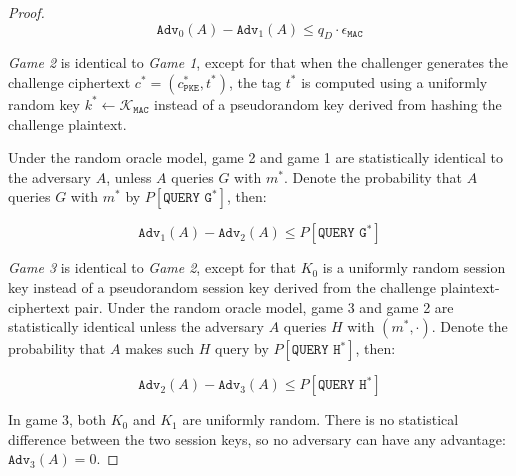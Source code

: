 \documentclass[floatrow,journal=tches,submission]{iacrtrans}
\newcommand{\pke}{\texttt{PKE}}
\newcommand{\mac}{\texttt{MAC}}
\begin{document}
\begin{proof}
    \begin{equation*}
        \texttt{Adv}_0(A) - \texttt{Adv}_1(A) \leq q_D \cdot \epsilon_\mac
    \end{equation*}

    \emph{Game 2} is identical to \emph{Game 1}, except for that when the challenger generates the challenge ciphertext $c^\ast = (c^\ast_\pke, t^\ast)$, the tag $t^\ast$ is computed using a uniformly random key $k^\ast \leftarrow \mathcal{K}_\mac$ instead of a pseudorandom key derived from hashing the challenge plaintext.

    Under the random oracle model, game 2 and game 1 are statistically identical to the adversary $A$, unless $A$ queries $G$ with $m^\ast$. Denote the probability that $A$ queries $G$ with $m^\ast$ by $P[\texttt{QUERY G}^\ast]$, then:

    \begin{equation*}
        \texttt{Adv}_1(A) - \texttt{Adv}_2(A) \leq P[\texttt{QUERY G}^\ast]
    \end{equation*}

    \emph{Game 3} is identical to \emph{Game 2}, except for that $K_0$ is a uniformly random session key instead of a pseudorandom session key derived from the challenge plaintext-ciphertext pair. Under the random oracle model, game 3 and game 2 are statistically identical unless the adversary $A$ queries $H$ with $(m^\ast, \cdot)$. Denote the probability that $A$ makes such $H$ query by $P[\texttt{QUERY H}^\ast]$, then:

    \begin{equation*}
        \texttt{Adv}_2(A) - \texttt{Adv}_3(A) \leq P[\texttt{QUERY H}^\ast]
    \end{equation*}

    In game 3, both $K_0$ and $K_1$ are uniformly random. There is no statistical difference between the two session keys, so no adversary can have any advantage: $\texttt{Adv}_3(A) = 0$.


\end{proof}
\end{document}
